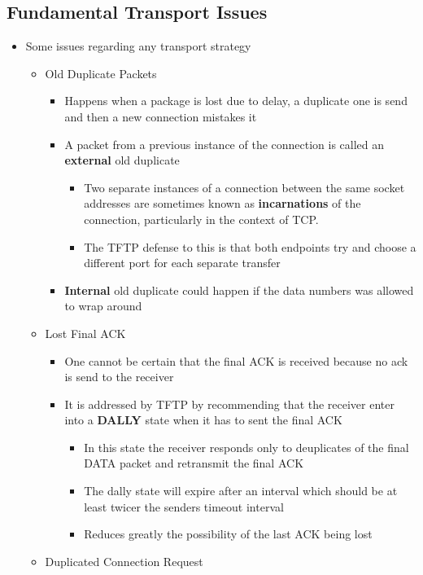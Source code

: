 \documentclass[11pt]{article}
\providecommand{\tightlist}{%
      \setlength{\itemsep}{0pt}\setlength{\parskip}{0pt}}
\begin{document}
    \subsection{Fundamental Transport
Issues}\label{fundamental-transport-issues}

\begin{itemize}
\tightlist
\item
  Some issues regarding any transport strategy

  \begin{itemize}
  \tightlist
  \item
    Old Duplicate Packets

    \begin{itemize}
    \tightlist
    \item
      Happens when a package is lost due to delay, a duplicate one is
      send and then a new connection mistakes it
    \item
      A packet from a previous instance of the connection is called an
      \textbf{external} old duplicate

      \begin{itemize}
      \tightlist
      \item
        Two separate instances of a connection between the same socket
        addresses are sometimes known as \textbf{incarnations} of the
        connection, particularly in the context of TCP.
      \item
        The TFTP defense to this is that both endpoints try and choose a
        different port for each separate transfer
      \end{itemize}
    \item
      \textbf{Internal} old duplicate could happen if the data numbers
      was allowed to wrap around
    \end{itemize}
  \item
    Lost Final ACK

    \begin{itemize}
    \tightlist
    \item
      One cannot be certain that the final ACK is received because no
      ack is send to the receiver
    \item
      It is addressed by TFTP by recommending that the receiver enter
      into a \textbf{DALLY} state when it has to sent the final ACK

      \begin{itemize}
      \tightlist
      \item
        In this state the receiver responds only to deuplicates of the
        final DATA packet and retransmit the final ACK
      \item
        The dally state will expire after an interval which should be at
        least twicer the senders timeout interval
      \item
        Reduces greatly the possibility of the last ACK being lost
      \end{itemize}
    \end{itemize}
  \item
    Duplicated Connection Request


\end{itemize}
\end{itemize}
\end{document}
